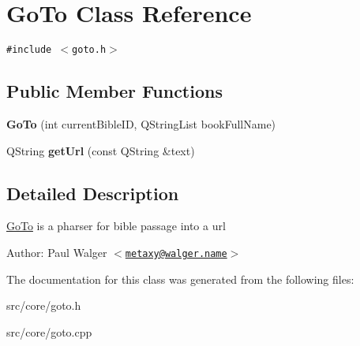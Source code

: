 \hypertarget{classGoTo}{
\section{GoTo Class Reference}
\label{classGoTo}
}
{\tt \#include $<$goto.h$>$}

\subsection*{Public Member Functions}
\begin{CompactItemize}
\item 
\hypertarget{classGoTo_f65860fd8cbfde047a2ac0b848c08ccb}{
\textbf{GoTo} (int currentBibleID, QStringList bookFullName)}
\label{classGoTo_f65860fd8cbfde047a2ac0b848c08ccb}

\item 
\hypertarget{classGoTo_beb80d20c63ea781fb6426690b11a8c1}{
QString \textbf{getUrl} (const QString \&text)}
\label{classGoTo_beb80d20c63ea781fb6426690b11a8c1}

\end{CompactItemize}


\subsection{Detailed Description}
\hyperlink{classGoTo}{GoTo} is a pharser for bible passage into a url

\begin{Desc}
\item[Author:]Paul Walger $<$\href{mailto:metaxy@walger.name}{\tt metaxy@walger.name}$>$ \end{Desc}


The documentation for this class was generated from the following files:\begin{CompactItemize}
\item 
src/core/goto.h\item 
src/core/goto.cpp\end{CompactItemize}

